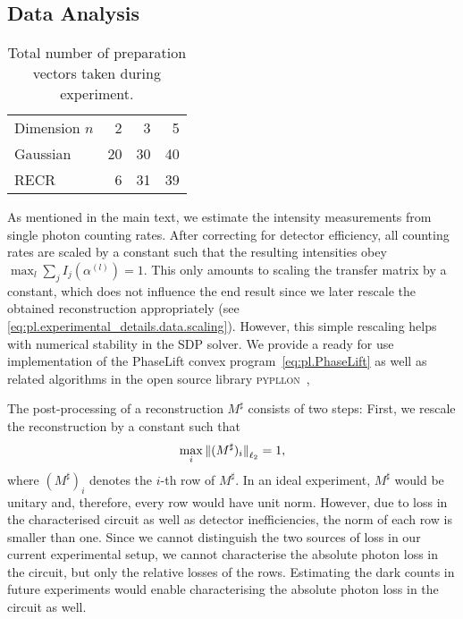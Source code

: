 \subsection{Data Analysis}%
\label{sub:pl.data_analysis}

\begin{table}
  \begin{tabular}{l | r r r}
    Dimension $n$ & 2 & 3 & 5 \\
    Gaussian & 20 & 30 & 40 \\
    RECR & 6 & 31 & 39 \\
  \end{tabular}
  \caption{%
    \label{tab:measurements}
    Total number of preparation vectors taken during experiment.
  }
\end{table}

As mentioned in the main text, we estimate the intensity measurements from single photon counting rates.
After correcting for detector efficiency, all counting rates are scaled by a constant such that the resulting intensities obey $\max_l \sum_j I_j(\alpha^{(l)}) = 1$.
This only amounts to scaling the transfer matrix by a constant, which does not influence the end result since we later rescale the obtained reconstruction appropriately (see \cref{eq:pl.experimental_details.data.scaling}).
However, this simple rescaling helps with numerical stability in the SDP solver.
We provide a ready for use implementation of the PhaseLift convex program~\eqref{eq:pl.PhaseLift} as well as related algorithms in the open source library \textsc{pypllon}~\cite{Suess_2017_Pypllon},

The post-processing of a reconstruction ${M}^\sharp$ consists of two steps:
First, we rescale the reconstruction by a constant such that
\[
  \label{eq:pl.experimental_details.data.scaling}
  \max_i {\Vert(M^\sharp)_i\Vert}_{\ell_2} = 1,
\]
where $(M^\sharp)_i$ denotes the $i$-th row of $M^\sharp$.
In an ideal experiment, $M^\sharp$ would be unitary and, therefore, every row would have unit norm.
However, due to loss in the characterised circuit as well as detector inefficiencies, the norm of each row is smaller than one.
Since we cannot distinguish the two sources of loss in our current experimental setup, we cannot characterise the absolute photon loss in the circuit, but only the relative losses of the rows.
Estimating the dark counts in future experiments would enable characterising the absolute photon loss in the circuit as well.

